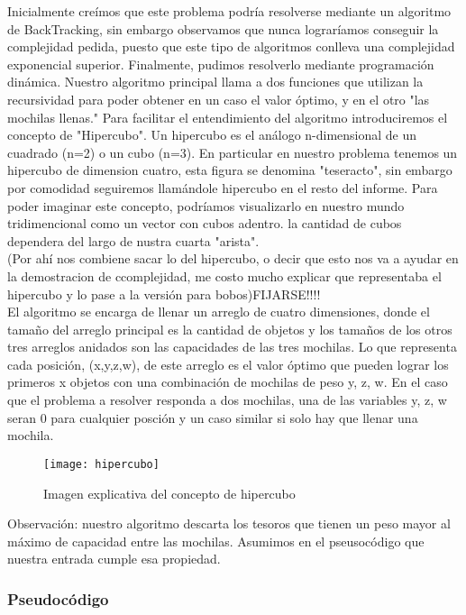 \documentclass[spanish,12pt]{article}
\begin{document}
   Inicialmente creímos que este problema podría resolverse mediante un algoritmo de BackTracking, sin embargo observamos que nunca lograríamos conseguir la complejidad pedida, puesto que este tipo de algoritmos conlleva una complejidad exponencial superior.
   Finalmente, pudimos resolverlo mediante programación dinámica. Nuestro algoritmo principal llama a dos funciones que utilizan la recursividad para poder obtener en un caso el valor óptimo, y en el otro "las mochilas llenas."
   Para facilitar el entendimiento del algoritmo introduciremos el concepto de "Hipercubo". Un hipercubo es el análogo n-dimensional de un cuadrado (n=2) o un cubo (n=3). En particular en nuestro problema tenemos un hipercubo de dimension cuatro, esta figura se denomina "teseracto", sin embargo por comodidad seguiremos llamándole hipercubo en el resto del informe.
Para poder imaginar este concepto, podríamos visualizarlo en nuestro mundo tridimencional como un vector con cubos adentro. la cantidad de cubos dependera del largo de nustra cuarta "arista".
\\
(Por ahí nos combiene sacar lo del hipercubo, o decir que esto nos va a ayudar en la demostracion de ccomplejidad, me costo mucho explicar que representaba el hipercubo y lo pase a la versión para bobos)FIJARSE!!!!
\\
	El algoritmo se encarga de llenar un arreglo de cuatro dimensiones, donde el tamaño del arreglo principal es la cantidad de objetos y los tamaños de los otros tres arreglos anidados son las capacidades de las tres mochilas.
	Lo que representa cada posición, (x,y,z,w), de este arreglo es el valor óptimo que pueden lograr los primeros x objetos con una combinación de mochilas de peso y, z, w. En el caso que el problema a resolver responda a dos mochilas, una de las variables y, z, w seran 0 para cualquier posción y un caso similar si solo hay que llenar una mochila.
\begin{figure}[H]
\centering
\texttt{[image: hipercubo]}
\caption{Imagen explicativa del concepto de hipercubo}
\end{figure}


Observación: nuestro algoritmo descarta los tesoros que tienen un peso mayor al máximo de capacidad entre las mochilas. Asumimos en el pseusocódigo que nuestra entrada cumple esa propiedad.


\subsubsection{Pseudocódigo}
\end{document}
